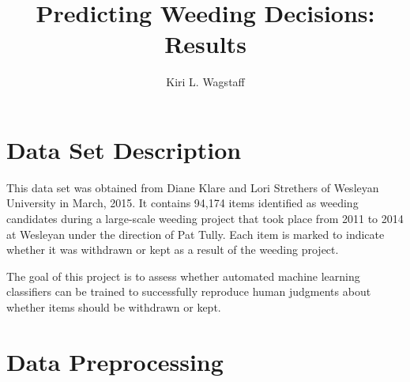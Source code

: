 \documentclass[man,11pt]{apa6}
\title{Predicting Weeding Decisions: Results}
\author{Kiri L. Wagstaff}
\affiliation{San Jose State University}
\begin{document}
\maketitle

\section{Data Set Description}

This data set was obtained from Diane Klare and Lori Strethers of
Wesleyan University in March, 2015.
%
It contains 94,174 items identified as weeding candidates during a
large-scale weeding project that took place from 2011 to 2014 at
Wesleyan under the direction of Pat Tully.  Each item is marked to
indicate whether it was withdrawn or kept as a result of the weeding
project.

The goal of this project is to assess whether automated machine
learning classifiers can be trained to successfully reproduce human
judgments about whether items should be withdrawn or kept.

\section{Data Preprocessing}
\end{document}
